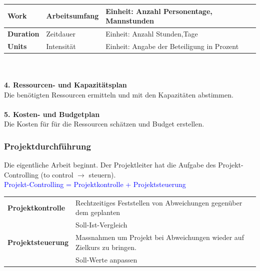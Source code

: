 \begin{tabular}{|l|l|l|}
	\hline \textbf{Work}& Arbeitsumfang & Einheit: Anzahl Personentage, Mannstunden\\
	\hline \textbf{Duration} & Zeitdauer & Einheit: Anzahl Stunden,Tage\\
	\hline \textbf{Units}& Intensität& Einheit: Angabe der Beteiligung in Prozent\\
	\hline
\end{tabular}\\\\
\textbf{4. Ressourcen- und Kapazitätsplan}\\
Die benötigten Ressourcen ermitteln und mit den Kapazitäten abstimmen. 
\\
\\
\textbf{5. Kosten- und Budgetplan}\\
Die Kosten für für die Ressourcen schätzen und Budget erstellen. 

\subsubsection{Projektdurchführung}
Die eigentliche Arbeit beginnt. Der Projektleiter hat die Aufgabe des Projekt-Controlling (to control $\rightarrow$ steuern).\\
\textcolor{blue}{Projekt-Controlling = Projektkontrolle + Projektsteuerung}
\renewcommand{\arraystretch}{1.2}
\begin{table}[h!]
	\begin{tabular}{|l|l|}
		\hline \textbf{Projektkontrolle} 	& Rechtzeitiges Feststellen von Abweichungen gegenüber dem geplanten \\ 
		& Soll-Ist-Vergleich\\
		\hline  \textbf{Projektsteuerung} 	& Massnahmen um Projekt bei Abweichungen wieder auf Zielkurs zu bringen. \\
		& Soll-Werte anpassen\\
		\hline
	\end{tabular}
\end{table}

